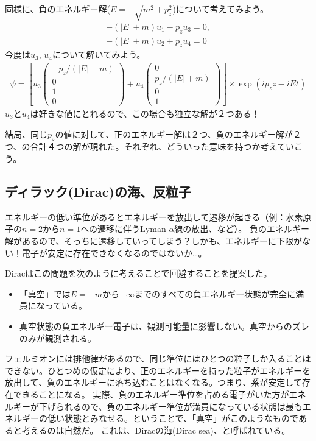 \documentclass[10pt,a4paper]{jarticle}
\begin{document}
同様に、負のエネルギー解($E = - \sqrt{m^2+p_z^2}$)について考えてみよう。
\begin{align}
-(|E|+m) u_1 - p_z u_3 = 0, \\
-(|E|+m) u_2 + p_z u_4 = 0
\end{align}
今度は$u_3$, $u_4$について解いてみよう。
\begin{align}
\psi =
\left[ u_3 \left(\begin{array}{cc}
-p_z/(|E|+m) \\ 0 \\ 1 \\ 0
\end{array}\right)
+
u_4 \left(\begin{array}{cc}
0 \\ p_z/(|E|+m) \\ 0 \\ 1
\end{array}\right) \right] \times \exp(ip_z z - i Et)
\end{align}
$u_3$と$u_4$は好きな値にとれるので、この場合も独立な解が２つある！

結局、同じ$p_z$の値に対して、正のエネルギー解は２つ、負のエネルギー解が２つ、の合計４つの解が現れた。それぞれ、どういった意味を持つか考えていこう。

\subsection{ディラック(Dirac)の海、反粒子}
エネルギーの低い準位があるとエネルギーを放出して遷移が起きる（例：水素原子の$n=2$から$n=1$への遷移に伴うLyman $\alpha$線の放出、など）。
負のエネルギー解があるので、そっちに遷移していってしまう？しかも、エネルギーに下限がない！電子が安定に存在できなくなるのではないか…。

Diracはこの問題を次のように考えることで回避することを提案した。
\begin{itemize}
\item 「真空」では$E=-m$から$-\infty$までのすべての負エネルギー状態が完全に満員になっている。
\item 真空状態の負エネルギー電子は、観測可能量に影響しない。真空からのズレのみが観測される。
\end{itemize}
フェルミオンには排他律があるので、同じ準位にはひとつの粒子しか入ることはできない。ひとつめの仮定により、正のエネルギーを持った粒子がエネルギーを放出して、負のエネルギーに落ち込むことはなくなる。つまり、系が安定して存在できることになる。
実際、負のエネルギー準位を占める電子がいた方がエネルギーが下げられるので、負のエネルギー準位が満員になっている状態は最もエネルギーの低い状態とみなせる。ということで、「真空」がこのようなものであると考えるのは自然だ。
これは、Diracの海(Dirac sea)、と呼ばれている。
\end{document}
